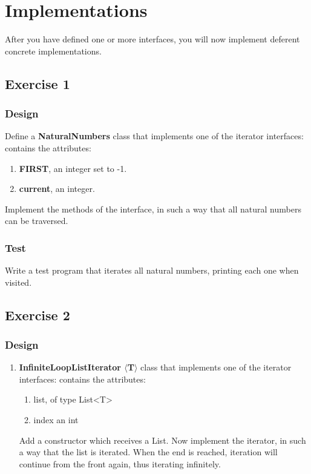 \section{Implementations}
After you have defined one or more interfaces, you will now implement deferent concrete implementations.

\subsection{Exercise 1}
    \subsubsection{Design}
        Define a \textbf{NaturalNumbers} class that implements one of the iterator interfaces: contains the attributes:
            \begin{enumerate}
                \item \textbf{FIRST}, an integer set to -1.
                \item \textbf{current}, an integer.
            \end{enumerate}
            Implement the methods of the interface, in such a way that all natural numbers can be traversed.

    \subsubsection{Test}
        Write a test program that iterates all natural numbers, printing each one when visited.


\subsection{Exercise 2}
    \subsubsection{Design}
        \begin{enumerate}
            \item \textbf{InfiniteLoopListIterator $\langle$T$\rangle$} class that implements one of the iterator interfaces: contains the attributes:
                \begin{enumerate}
                    \item list, of type List<T>
                    \item index an int
                \end{enumerate}

           Add a constructor which receives a List.
           Now implement the iterator, in such a way that the list is iterated. When the end is reached, iteration will continue from the front again, thus iterating infinitely.
        \end{enumerate}

